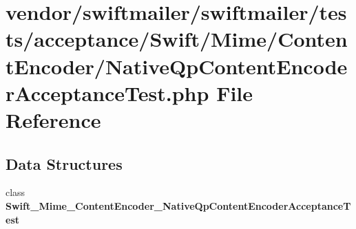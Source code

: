 \section{vendor/swiftmailer/swiftmailer/tests/acceptance/\+Swift/\+Mime/\+Content\+Encoder/\+Native\+Qp\+Content\+Encoder\+Acceptance\+Test.php File Reference}
\label{_native_qp_content_encoder_acceptance_test_8php}
\subsection*{Data Structures}
\begin{DoxyCompactItemize}
\item 
class {\bf Swift\+\_\+\+Mime\+\_\+\+Content\+Encoder\+\_\+\+Native\+Qp\+Content\+Encoder\+Acceptance\+Test}
\end{DoxyCompactItemize}
